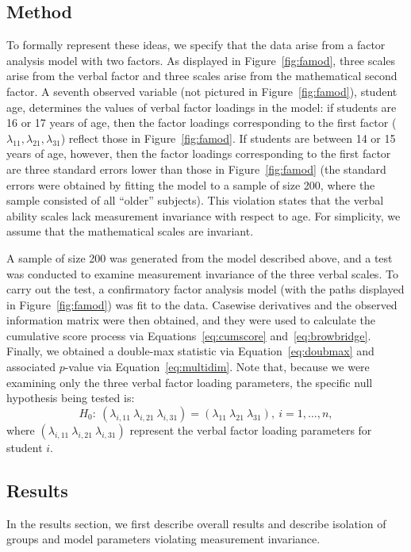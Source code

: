 \documentclass[man]{apa}
\begin{document}
\subsection{Method}

To formally represent these ideas, we specify that the data arise from
a factor analysis model with two factors.  As displayed in
Figure~\ref{fig:famod},
three scales arise from the verbal factor and three 
scales arise from the mathematical second factor.
A seventh observed variable (not pictured in Figure~\ref{fig:famod}),
student age, determines the values of 
verbal factor loadings in the model: 
if students are 16 or 17 years of age, then the factor
loadings corresponding to the first 
factor ($\lambda_{11}, \lambda_{21}, \lambda_{31}$) reflect those in
Figure~\ref{fig:famod}.  If students are between 14 or 15 years of age,
however, then the factor loadings corresponding to the first factor
are three standard errors lower than those in Figure~\ref{fig:famod}
(the standard errors were obtained by fitting
  the model to a sample of size 200, where the sample consisted of all
  ``older'' subjects).
This violation states that the verbal ability scales
lack measurement invariance with respect to age.  For simplicity, we
assume that the mathematical scales are invariant.



A sample of size 200 was generated from the model described above, and
a test was conducted to examine measurement invariance of the three
verbal scales.  To carry out
the test, a confirmatory factor analysis model (with the paths
displayed in Figure~\ref{fig:famod}) was fit to the
data.  Casewise derivatives and 
the observed information matrix were then obtained, and they were used
to calculate the cumulative score process via
Equations~\eqref{eq:cumscore} and~\eqref{eq:browbridge}.  Finally, we
obtained a 
double-max statistic via Equation~\eqref{eq:doubmax} and associated
$p$-value via Equation~\eqref{eq:multidim}.  Note that, because we
were examining only the three verbal factor loading parameters, the
specific null hypothesis being tested is:
\begin{equation}
    \label{eq:exh0}
H_0:\ (\lambda_{i,11}\ \lambda_{i,21}\ \lambda_{i,31}) =
(\lambda_{11}\ \lambda_{21}\ \lambda_{31}),\ i=1,\ldots,n,
\end{equation}
where $(\lambda_{i,11}\ \lambda_{i,21}\ \lambda_{i,31})$ represent the
verbal factor loading parameters for student $i$.

\subsection{Results}
In the results section, we first describe overall results and
describe isolation of groups and model parameters violating
measurement invariance.
\end{document}
